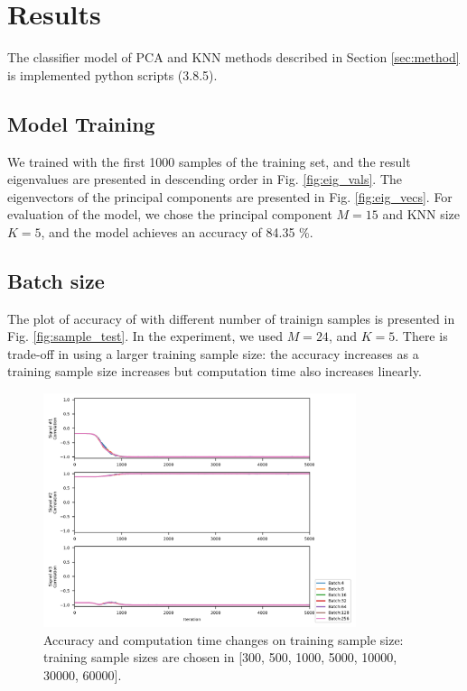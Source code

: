 \documentclass[conference]{IEEEtran}
\begin{document}
\section{Results} %

The classifier model of PCA and KNN methods described in Section \ref{sec:method} is implemented python scripts (3.8.5).

\subsection{Model Training}
We trained with the first 1000 samples of the training set, and the result eigenvalues are presented in descending order in Fig. \ref{fig:eig_vals}.
The eigenvectors of the principal components are presented in Fig. \ref{fig:eig_vecs}.
For evaluation of the model, we chose the principal component $M=15$ and KNN size $K=5$, and the model achieves an accuracy of 84.35 \%.


\subsection{Batch size}

The plot of accuracy of with different number of trainign samples is presented in Fig. \ref{fig:sample_test}.
In the experiment, we used $M=24$, and $K=5$.
There is trade-off in using a larger training sample size: the accuracy increases as a training sample size increases but computation time also increases linearly.

\begin{figure}[!t]
	\centering
	\includegraphics[width=3.6in]{source3/batch_test.png}	
	\caption{Accuracy and computation time changes on training sample size: training sample sizes are chosen in [300, 500, 1000, 5000, 10000, 30000, 60000].}
	\label{fig:batch_test}
\end{figure}
\end{document}
